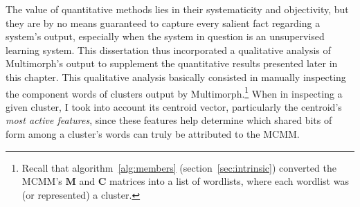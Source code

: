 
The value of quantitative methods lies in their systematicity and objectivity, but
they are by no means guaranteed to capture every salient fact regarding a system's output,
especially when the system in question is an unsupervised learning system. 
 This dissertation thus incorporated a qualitative analysis of Multimorph's output to supplement the  
quantitative results presented later in this chapter.
This qualitative analysis basically consisted in manually inspecting the component words of clusters output by Multimorph.\footnote{
Recall that
algorithm~\ref{alg:members} (section~\ref{sec:intrinsic}) converted the MCMM's $\mathbf{M}$ and $\mathbf{C}$
matrices into a list of wordlists, where each wordlist was (or represented) a cluster.} 
When in inspecting a given cluster, I took into account its centroid vector, particularly the centroid's \emph{most active
features}, since these features help determine which shared bits of form among a cluster's words can truly be attributed to the MCMM. 
%

